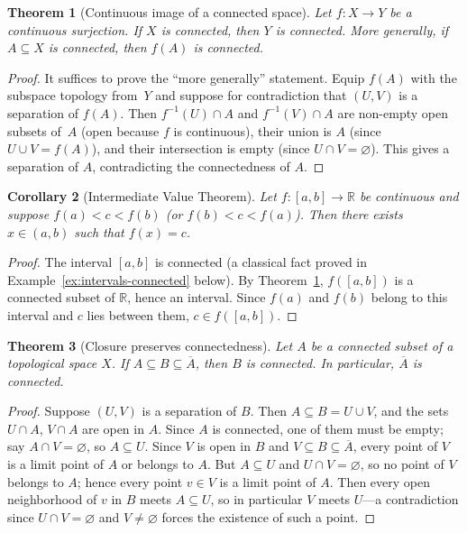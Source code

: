 \documentclass[11pt,a4paper,twoside]{book}
\newtheorem{theorem}{Theorem}[section]
\newtheorem{corollary}[theorem]{Corollary}
\theoremstyle{remark}
\theoremstyle{definition}
\theoremstyle{definition}
\begin{document}
\begin{theorem}[Continuous image of a connected space]
\label{thm:continuous-image-connected}
Let $f\colon X\to Y$ be a continuous surjection.  If $X$ is
connected, then $Y$ is connected.  More generally, if $A\subseteq X$
is connected, then $f(A)$ is connected.
\end{theorem}

\begin{proof}
It suffices to prove the ``more generally'' statement.  Equip
$f(A)$ with the subspace topology from~$Y$ and suppose for
contradiction that $(U,V)$ is a separation of $f(A)$.  Then
$f^{-1}(U)\cap A$ and $f^{-1}(V)\cap A$ are non-empty open subsets
of~$A$ (open because $f$ is continuous), their union is $A$
(since $U\cup V=f(A)$), and their intersection is empty (since
$U\cap V=\varnothing$).  This gives a separation of $A$,
contradicting the connectedness of $A$.
\end{proof}

\begin{corollary}[Intermediate Value Theorem]
\label{cor:IVT}
Let $f\colon[a,b]\to\mathbb{R}$ be continuous and suppose
$f(a)<c<f(b)$ (or $f(b)<c<f(a)$).  Then there exists
$x\in(a,b)$ such that $f(x)=c$.
\end{corollary}

\begin{proof}
The interval $[a,b]$ is connected (a classical fact proved in
Example~\ref{ex:intervals-connected} below).  By
Theorem~\ref{thm:continuous-image-connected}, $f([a,b])$ is a
connected subset of $\mathbb{R}$, hence an interval.  Since
$f(a)$ and $f(b)$ belong to this interval and $c$ lies between
them, $c\in f([a,b])$.
\end{proof}

\begin{theorem}[Closure preserves connectedness]
\label{thm:closure-connected}
Let $A$ be a connected subset of a topological space $X$.  If
$A\subseteq B\subseteq\overline{A}$, then $B$ is connected.
In particular, $\overline{A}$ is connected.
\end{theorem}

\begin{proof}
Suppose $(U,V)$ is a separation of $B$.  Then $A\subseteq B=U\cup V$,
and the sets $U\cap A$, $V\cap A$ are open in $A$.  Since $A$ is
connected, one of them must be empty; say $A\cap V=\varnothing$,
so $A\subseteq U$.  Since $V$ is open in $B$ and
$V\subseteq B\subseteq\overline{A}$, every point of $V$ is a limit
point of $A$ or belongs to $A$.  But $A\subseteq U$ and $U\cap V=\varnothing$,
so no point of $V$ belongs to $A$; hence every point $v\in V$ is a
limit point of $A$.  Then every open neighborhood of $v$ in $B$
meets $A\subseteq U$, so in particular $V$ meets $U$---a contradiction
since $U\cap V=\varnothing$ and $V\neq\varnothing$ forces the
existence of such a point.
\end{proof}
\end{document}
